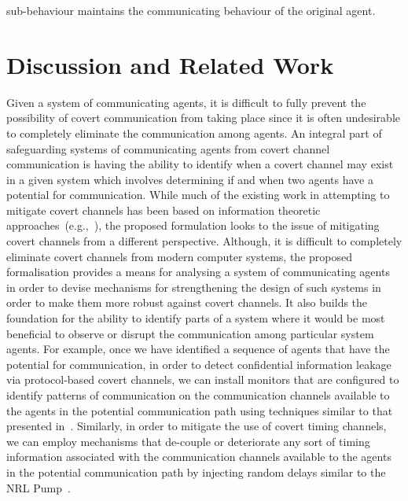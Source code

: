 \documentclass[copyright,creativecommons]{eptcs}
\makeatletter
\newcommand{\eg}{\textrm{e.g.,}\@\xspace}
\newcommand{\PFC}{potential for communication\@\xspace}
\newcommand{\soca}{system of communicating agents\@\xspace}
\newcommand{\socas}{systems of communicating agents\@\xspace}
\makeatother
\begin{document}
sub-behaviour maintains the communicating behaviour of the original agent. 

%
 

\vspace{-0.175in}
\section{Discussion and Related Work}
\label{sec:discussion}
\vspace{-0.1in}
Given a \soca, it is difficult to fully prevent the possibility of covert communication from taking place since it is often undesirable to completely eliminate the communication among agents. An integral part of safeguarding \socas from covert channel communication is having the ability to identify when a covert channel may exist in a given system which involves determining if and when two agents have a \PFC. While much of the existing work in attempting to mitigate covert channels has been based on information theoretic approaches~(\eg~\cite{Gianvecchio2007aa,Giles2002aa,Giles1999aa,Helouet2010aa,Lowe2002aa,Martin2006aa,Millen1987aa,Millen1989aa,Moskowitz1994aa}), the proposed formulation looks to the issue of mitigating covert channels from a different perspective. Although, it is difficult to completely eliminate covert channels from modern computer systems, the proposed formalisation provides a means for analysing a \soca in order to devise mechanisms for strengthening the design of such systems in order to make them more robust against covert channels. It also builds the foundation for the ability to identify parts of a system where it would be most beneficial to observe or disrupt the communication among particular system agents. For example, once we have identified a sequence of agents that have the \PFC, in order to detect confidential information leakage via protocol-based covert channels, we can install monitors that are configured to identify patterns of communication on the communication channels available to the agents in the potential communication path using techniques similar to that presented in~\cite{Jaskolka2011ac}. Similarly, in order to mitigate the use of covert timing channels, we can employ mechanisms that de-couple or deteriorate any sort of timing information associated with the communication channels available to the agents in the potential communication path by injecting random delays similar to the NRL Pump~\cite{Kang1993aa}. 
\end{document}
